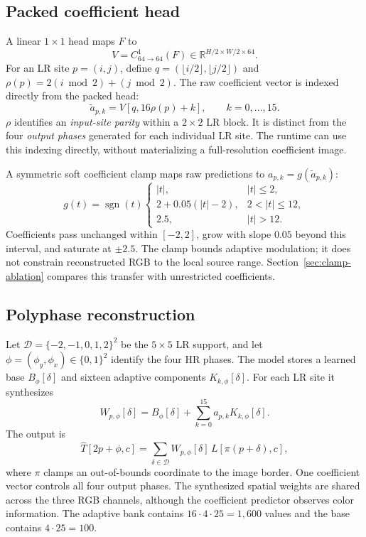 \documentclass[10pt,twocolumn,letterpaper]{article}
\newcommand{\R}{\mathbb{R}}
\newcommand{\sgn}{\operatorname{sgn}}
\begin{document}
\subsection{Packed coefficient head}
\label{sec:head}
A linear $1\times1$ head maps $F$ to
\begin{equation}
 V=C^1_{64\rightarrow64}(F)
 \in\R^{H/2\times W/2\times64}.
 \label{eq:head}
\end{equation}
For an LR site $p=(i,j)$, define $q=(\lfloor i/2\rfloor,\lfloor j/2\rfloor)$ and
$\rho(p)=2(i\bmod2)+(j\bmod2)$.
The raw coefficient vector is indexed directly from the packed head:
\begin{equation}
 \widetilde a_{p,k}=V[q,16\rho(p)+k],\qquad k=0,\ldots,15.
 \label{eq:parity}
\end{equation}
$\rho$ identifies an \emph{input-site parity} within a $2\times2$ LR block.
It is distinct from the four \emph{output phases} generated for each individual LR site.
The runtime can use this indexing directly, without materializing a full-resolution coefficient image.

A symmetric soft coefficient clamp maps raw predictions to $a_{p,k}=g(\widetilde a_{p,k})$:
\begin{equation}
 g(t)=\sgn(t)\begin{cases}
 |t|, & |t|\leq2,\\
 2+0.05(|t|-2), & 2<|t|\leq12,\\
 2.5, & |t|>12.
 \end{cases}
 \label{eq:coefficient-clamp}
\end{equation}
Coefficients pass unchanged within $[-2,2]$, grow with slope $0.05$ beyond this interval, and saturate at $\pm2.5$.
The clamp bounds adaptive modulation; it does not constrain reconstructed RGB to the local source range.
Section~\ref{sec:clamp-ablation} compares this transfer with unrestricted coefficients.

\subsection{Polyphase reconstruction}
\label{sec:reconstruct}
Let $\mathcal D=\{-2,-1,0,1,2\}^2$ be the $5\times5$ LR support, and let $\phi=(\phi_y,\phi_x)\in\{0,1\}^2$ identify the four HR phases.
The model stores a learned base $B_\phi[\delta]$ and sixteen adaptive components $K_{k,\phi}[\delta]$.
For each LR site it synthesizes
\begin{equation}
 W_{p,\phi}[\delta]=B_\phi[\delta]
             +\sum_{k=0}^{15}a_{p,k}K_{k,\phi}[\delta].
 \label{eq:kernel}
\end{equation}
The output is
\begin{equation}
 \widehat T[2p+\phi,c]
   =\sum_{\delta\in\mathcal D}W_{p,\phi}[\delta]\,
     L[\pi(p+\delta),c],
 \label{eq:reconstruct}
\end{equation}
where $\pi$ clamps an out-of-bounds coordinate to the image border.
One coefficient vector controls all four output phases.
The synthesized spatial weights are shared across the three RGB channels, although the coefficient predictor observes color information.
The adaptive bank contains $16\cdot4\cdot25=1{,}600$ values and the base contains $4\cdot25=100$.
\end{document}
